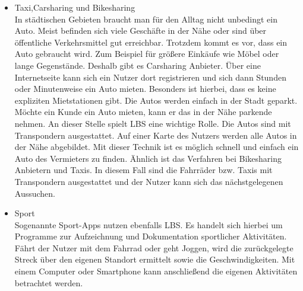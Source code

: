 \begin{itemize}
	
	\item Taxi,Carsharing und Bikesharing\\
	In städtischen Gebieten braucht man für den Alltag nicht unbedingt ein Auto. Meist befinden sich viele Geschäfte in der Nähe oder sind über öffentliche Verkehrsmittel gut erreichbar. Trotzdem kommt es vor, dass ein Auto gebraucht wird. Zum Beispiel für größere Einkäufe wie Möbel oder lange Gegenstände. Deshalb gibt es Carsharing Anbieter. Über eine Internetseite kann sich ein Nutzer dort registrieren und sich dann Stunden oder Minutenweise ein Auto mieten. Besonders ist hierbei, dass es keine expliziten Mietstationen gibt. Die Autos werden einfach in der Stadt geparkt. Möchte ein Kunde ein Auto mieten, kann er das in der Nähe parkende nehmen. An dieser Stelle spielt LBS eine wichtige Rolle. Die Autos sind mit Transpondern ausgestattet. Auf einer Karte des Nutzers werden alle Autos in der Nähe abgebildet. Mit dieser Technik ist es möglich schnell und einfach ein Auto des Vermieters zu finden. Ähnlich ist das Verfahren bei Bikesharing Anbietern und Taxis. In diesem Fall sind die Fahrräder bzw. Taxis mit Transpondern ausgestattet und der Nutzer kann sich das nächstgelegenen Aussuchen.
	\item Sport\\
	Sogenannte Sport-Apps nutzen ebenfalls LBS. Es handelt sich hierbei um Programme zur Aufzeichnung und Dokumentation sportlicher Aktivitäten. Fährt der Nutzer mit dem Fahrrad oder geht Joggen, wird die zurückgelegte Streck über den eigenen Standort ermittelt  sowie die Geschwindigkeiten. Mit einem Computer oder Smartphone kann anschließend die eigenen Aktivitäten betrachtet werden. 
\end{itemize}

